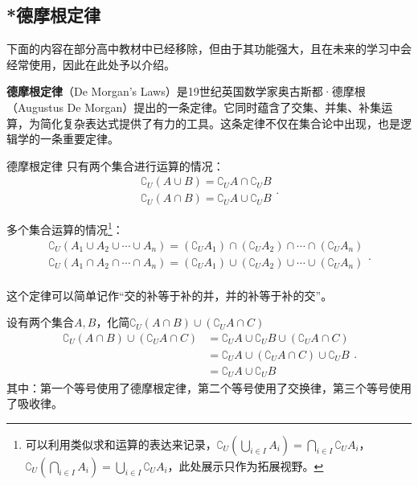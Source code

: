 \subsection{*德摩根定律}\label{sub_HsSeOp_1}

下面的内容在部分高中教材中已经移除，但由于其功能强大，且在未来的学习中会经常使用，因此在此处予以介绍。

\textbf{德摩根定律}（De Morgan’s Laws）是19世纪英国数学家奥古斯都·德摩根（Augustus De Morgan）提出的一条定律。它同时蕴含了交集、并集、补集运算，为简化复杂表达式提供了有力的工具。这条定律不仅在集合论中出现，也是逻辑学的一条重要定律。

\begin{theorem}{德摩根定律}
只有两个集合进行运算的情况：
\begin{equation}
\begin{array}{c} 
\complement_U(A \cup B) = \complement_U A \cap \complement_U B \\  
\complement_U(A \cap B) = \complement_U A \cup \complement_U B
\end{array}.~
\end{equation}

多个集合运算的情况\footnote{可以利用类似求和运算的表达来记录，$\displaystyle\complement_U(\bigcup_{i\in I} A_i)=\bigcap_{i\in I} {\complement_UA_i}$，$\displaystyle\complement_U(\bigcap_{i\in I} A_i)=\bigcup_{i\in I} {\complement_UA_i}$，此处展示只作为拓展视野。}：
\begin{equation}
\begin{array}{c} 
\displaystyle
\complement_U(A_1\cup A_2\cup\cdots\cup A_n)=(\complement_UA_1)\cap (\complement_UA_2)\cap\cdots\cap(\complement_UA_n)\\  
\displaystyle
\complement_U(A_1\cap A_2\cap\cdots\cap A_n)=(\complement_UA_1)\cup (\complement_UA_2)\cup\cdots\cup(\complement_UA_n)\\  
\end{array}.~
\end{equation}
\end{theorem}

这个定律可以简单记作“交的补等于补的并，并的补等于补的交”。

\begin{example}{设有两个集合$A,B$，化简$\complement_U(A \cap B)\cup (\complement_UA \cap C)$}
$$
\begin{align*} 
\complement_U(A \cap B)\cup (\complement_UA \cap C) &= \complement_UA \cup \complement_UB\cup (\complement_UA \cap C) \\ 
&= \complement_UA\cup (\complement_UA \cap C)  \cup \complement_UB\\ 
&=\complement_UA\cup \complement_UB
\end{align*}.~
$$
其中：第一个等号使用了德摩根定律，第二个等号使用了交换律，第三个等号使用了吸收律。
\end{example}



